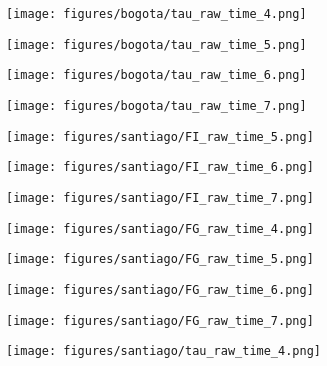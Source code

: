 \documentclass[a4paper]{article}
\def\lthtmlcheckvsize{\ifdim\ht\sizebox<\vsize 
  \ifdim\wd\sizebox<\hsize\expandafter\hfill\fi \expandafter\vfill
  \else\expandafter\vss\fi}%
\begin{document}
{\newpage\clearpage
{}%
\texttt{[image: figures/bogota/tau\_raw\_time\_4.png]}%
\lthtmlpictureZ
\lthtmlcheckvsize\clearpage}

{\newpage\clearpage
{}%
\texttt{[image: figures/bogota/tau\_raw\_time\_5.png]}%
\lthtmlpictureZ
\lthtmlcheckvsize\clearpage}

{\newpage\clearpage
{}%
\texttt{[image: figures/bogota/tau\_raw\_time\_6.png]}%
\lthtmlpictureZ
\lthtmlcheckvsize\clearpage}

{\newpage\clearpage
{}%
\texttt{[image: figures/bogota/tau\_raw\_time\_7.png]}%
\lthtmlpictureZ
\lthtmlcheckvsize\clearpage}

{\newpage\clearpage
{}%
\texttt{[image: figures/santiago/FI\_raw\_time\_5.png]}%
\lthtmlpictureZ
\lthtmlcheckvsize\clearpage}

{\newpage\clearpage
{}%
\texttt{[image: figures/santiago/FI\_raw\_time\_6.png]}%
\lthtmlpictureZ
\lthtmlcheckvsize\clearpage}

{\newpage\clearpage
{}%
\texttt{[image: figures/santiago/FI\_raw\_time\_7.png]}%
\lthtmlpictureZ
\lthtmlcheckvsize\clearpage}

{\newpage\clearpage
{}%
\texttt{[image: figures/santiago/FG\_raw\_time\_4.png]}%
\lthtmlpictureZ
\lthtmlcheckvsize\clearpage}

{\newpage\clearpage
{}%
\texttt{[image: figures/santiago/FG\_raw\_time\_5.png]}%
\lthtmlpictureZ
\lthtmlcheckvsize\clearpage}

{\newpage\clearpage
{}%
\texttt{[image: figures/santiago/FG\_raw\_time\_6.png]}%
\lthtmlpictureZ
\lthtmlcheckvsize\clearpage}

{\newpage\clearpage
{}%
\texttt{[image: figures/santiago/FG\_raw\_time\_7.png]}%
\lthtmlpictureZ
\lthtmlcheckvsize\clearpage}

{\newpage\clearpage
{}%
\texttt{[image: figures/santiago/tau\_raw\_time\_4.png]}%
\lthtmlpictureZ
\lthtmlcheckvsize\clearpage}
\end{document}
